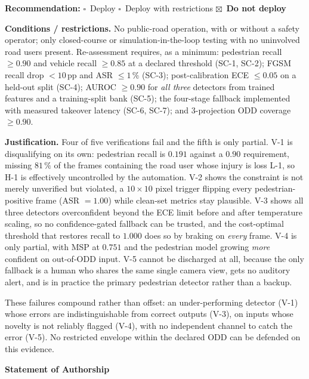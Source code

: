 \documentclass[a4paper,12pt]{article}
\begin{document}
\begin{mdframed}[style=subclaim]
\textbf{Recommendation:} \quad
$\square$\ Deploy \quad $\square$\ Deploy with restrictions \quad
$\boxtimes$\ \textbf{Do not deploy}

\medskip
\noindent\textbf{Conditions / restrictions.} No public-road operation, with or without a
safety operator; only closed-course or simulation-in-the-loop testing with no uninvolved
road users present. Re-assessment requires, as a minimum: pedestrian recall $\geq0.90$ and
vehicle recall $\geq0.85$ at a declared threshold (SC-1, SC-2); FGSM recall drop $<10$\,pp
and ASR $\leq1\,\%$ (SC-3); post-calibration ECE $\leq0.05$ on a held-out split (SC-4);
AUROC $\geq0.90$ for \emph{all three} detectors from trained features and a training-split
bank (SC-5); the four-stage fallback implemented with measured takeover latency (SC-6,
SC-7); and 3-projection ODD coverage $\geq0.90$.

\medskip
\noindent\textbf{Justification.} Four of five verifications fail and the fifth is only
partial. V-1 is disqualifying on its own: pedestrian recall is $0.191$ against a $0.90$
requirement, missing $81\,\%$ of the frames containing the road user whose injury is loss
L-1, so H-1 is effectively uncontrolled by the automation. V-2 shows the constraint is not
merely unverified but violated, a $10\times10$ pixel trigger flipping every
pedestrian-positive frame (ASR $=1.00$) while clean-set metrics stay plausible. V-3 shows
all three detectors overconfident beyond the ECE limit before and after temperature
scaling, so no confidence-gated fallback can be trusted, and the cost-optimal threshold
that restores recall to $1.000$ does so by braking on \emph{every} frame. V-4 is only
partial, with MSP at $0.751$ and the pedestrian model growing \emph{more} confident on
out-of-ODD input. V-5 cannot be discharged at all, because the only fallback is a human who
shares the same single camera view, gets no auditory alert, and is in practice the primary
pedestrian detector rather than a backup.

These failures compound rather than offset: an under-performing detector (V-1) whose errors
are indistinguishable from correct outputs (V-3), on inputs whose novelty is not reliably
flagged (V-4), with no independent channel to catch the error (V-5). No restricted envelope
within the declared ODD can be defended on this evidence.
\end{mdframed}



\clearpage
\thispagestyle{empty}
\begin{center}
  {\large\bfseries\color{mls@blue}Statement of Authorship}
\end{center}
\end{document}
